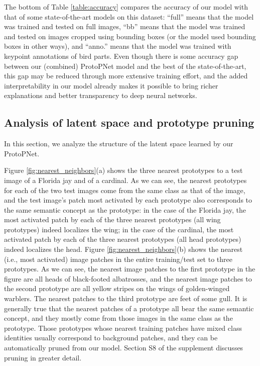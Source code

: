 \documentclass[conference]{IEEEtran}
\begin{document}
The bottom of Table \ref{table:accuracy} compares the accuracy of our model with that of some state-of-the-art models on this dataset: ``full'' means that the model was trained and tested on full images, ``bb'' means that the model was trained and tested on images cropped using bounding boxes (or the model used bounding boxes in other ways), and ``anno.'' means that the model was trained with keypoint annotations of bird parts. Even though there is some accuracy gap between our (combined) ProtoPNet model and the best of the state-of-the-art, this gap may be reduced through more extensive training effort, and the added interpretability in our model already makes it possible to bring richer explanations and better transparency to deep neural networks.

\subsection{Analysis of latent space and prototype pruning}

In this section, we analyze the structure of the latent space learned by our ProtoPNet.

Figure \ref{fig:nearest_neighbors}(a) shows the three nearest prototypes to a test image of a Florida jay and of a cardinal.
As we can see, the nearest prototypes for each of the two test images come from the same class as that of the image, and the test image's patch most activated by each prototype also corresponds to the same semantic concept as the prototype: in the case of the Florida jay, the most activated patch by each of the three nearest prototypes (all wing prototypes) indeed localizes the wing;
in the case of the cardinal, the most activated patch by each of the three nearest prototypes (all head prototypes) indeed localizes the head.
Figure \ref{fig:nearest_neighbors}(b) shows the nearest (i.e., most activated) image patches in the entire training/test set to three prototypes. As we can see, the nearest image patches to the first prototype in the figure are all heads of black-footed albatrosses, and the nearest image patches to the second prototype are all yellow stripes on the wings of golden-winged warblers. The nearest patches to the third prototype are feet of some gull. It is generally true that the nearest patches of a prototype all bear the same semantic concept, and they mostly come from those images in the same class as the prototype. Those prototypes whose nearest training patches have mixed class identities usually correspond to background patches, and they can be automatically pruned from our model. Section S8 of the supplement discusses pruning in greater detail.
\end{document}
